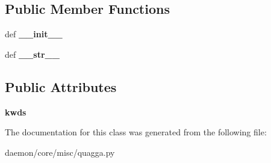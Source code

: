 \subsection*{Public Member Functions}
\begin{DoxyCompactItemize}
\item 
\hypertarget{classcore_1_1misc_1_1quagga_1_1_conf_a5bdaca13872f32c6431c500514ac9158}{def {\bfseries \+\_\+\+\_\+init\+\_\+\+\_\+}}\label{classcore_1_1misc_1_1quagga_1_1_conf_a5bdaca13872f32c6431c500514ac9158}

\item 
\hypertarget{classcore_1_1misc_1_1quagga_1_1_conf_a108a8bac4a1d4fc55a4ed56956759bd3}{def {\bfseries \+\_\+\+\_\+str\+\_\+\+\_\+}}\label{classcore_1_1misc_1_1quagga_1_1_conf_a108a8bac4a1d4fc55a4ed56956759bd3}

\end{DoxyCompactItemize}
\subsection*{Public Attributes}
\begin{DoxyCompactItemize}
\item 
\hypertarget{classcore_1_1misc_1_1quagga_1_1_conf_af655c127b9417e3869b32acf9b2df0fd}{{\bfseries kwds}}\label{classcore_1_1misc_1_1quagga_1_1_conf_af655c127b9417e3869b32acf9b2df0fd}

\end{DoxyCompactItemize}


The documentation for this class was generated from the following file\+:\begin{DoxyCompactItemize}
\item 
daemon/core/misc/quagga.\+py\end{DoxyCompactItemize}
